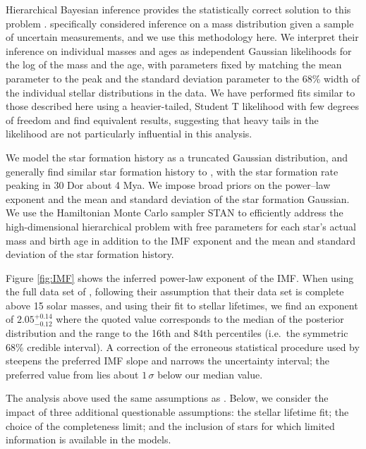 \documentclass[apjl]{emulateapj}
\newcommand{\onesigrange}[3]{\ensuremath{#1^{+#2}_{-#3}}}
\newcommand{\alpharangeone}{\onesigrange{2.05}{0.14}{0.12}}
\begin{document}
Hierarchical Bayesian inference provides the statistically correct solution to
this problem \citep{Hogg:2010}.  \citet{Mandel:2010stat} specifically considered
inference on a mass distribution given a sample of uncertain measurements, and
we use this methodology here.  We interpret their inference
on individual masses and ages as independent Gaussian likelihoods for the log
of the mass and the age, with parameters fixed by matching the mean parameter to the peak and the standard deviation parameter to the 68\% width of the
individual stellar distributions in the \citet{Schneider:2018} data.  We have performed fits similar to those described here using a heavier-tailed, Student T likelihood with few degrees of freedom and find equivalent results, suggesting that heavy tails in the likelihood are not particularly influential in this analysis.

We model the star formation history as a truncated Gaussian distribution, and
generally find similar star formation history to \citet{Schneider:2018}, with
the star formation rate peaking in 30 Dor about 4 Mya.  We impose broad priors
on the power--law exponent and the mean and standard deviation of the star
formation Gaussian.    We use the Hamiltonian Monte Carlo sampler STAN
\citep{STAN} to efficiently address the high-dimensional hierarchical problem
with free parameters for each star's actual mass and birth age in addition to
the IMF exponent and the mean and standard deviation of the star formation
history.

Figure \ref{fig:IMF} shows the inferred power-law exponent of the IMF.   When
using the full data set of \citet{Schneider:2018}, following their assumption
that their data set is complete above 15 solar masses, and using their fit to
stellar lifetimes, we find an exponent of $\alpharangeone$ where the quoted
value corresponds to the median of the posterior distribution and the range to
the 16th and 84th percentiles (i.e.\ the symmetric 68\% credible interval).   A
correction of the erroneous statistical procedure used by \citet{Schneider:2018}
steepens the preferred IMF slope and narrows the uncertainty interval; the
preferred value from \citet{Schneider:2018} lies about $1\, \sigma$ below our
median value.

The analysis above used the same assumptions as \citet{Schneider:2018}.  Below, we consider the impact of three additional questionable assumptions: the stellar lifetime fit; the choice of the completeness limit; and the inclusion of stars for which limited information is available in the models.
\end{document}
